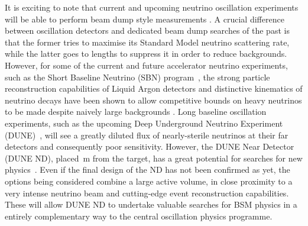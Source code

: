 It is exciting to note that current and upcoming neutrino oscillation
experiments will be able to perform beam dump style measurements \cite{Kusenko:2004qc, Asaka:2012bb, Abe:2019kgx}. 
%
A crucial difference between oscillation detectors and dedicated beam dump searches of the past is that %
the former tries to maximise its Standard Model neutrino scattering rate, while the latter goes to lengths %
to suppress it in order to reduce backgrounds.
%
However, for some of the current and future accelerator neutrino experiments, %
such as the Short Baseline Neutrino (SBN) program~\cite{Antonello:2015lea}, %
the strong particle reconstruction capabilities of Liquid Argon detectors and distinctive kinematics %
of neutrino decays have been shown to allow competitive bounds on heavy neutrinos %
to be made despite naively large backgrounds \cite{Ballett:2016opr}. 
%
Long baseline oscillation experiments, such as the upcoming Deep Underground Neutrino Experiment (DUNE)~\cite{Abi:2018dnh}, %
will see a greatly diluted flux of nearly-sterile neutrinos at their far detectors and consequently poor sensitivity.
However, the DUNE Near Detector (DUNE ND), placed \,m from the target, has a great potential %
for searches for new physics~\cite{Adams:2013qkq}.
Even if the final design of the ND has not been confirmed as yet, the options being considered combine a large active volume, %
in close proximity to a very intense neutrino beam and cutting-edge event reconstruction capabilities.
These will allow DUNE ND to undertake valuable searches for BSM physics in a entirely complementary way %
to the central oscillation physics programme. 

